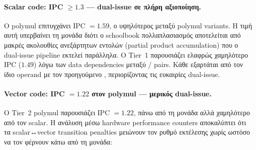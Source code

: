 \paragraph{Scalar code: IPC $\geq 1.3$ — dual-issue σε πλήρη αξιοποίηση.}
Ο  polymul επιτυγχάνει IPC $= 1.59$, ο υψηλότερος
μεταξύ polymul variants. Η τιμή αυτή υπερβαίνει τη μονάδα διότι ο
schoolbook πολλαπλασιασμός αποτελείται από μακρές ακολουθίες ανεξάρτητων
 εντολών (partial product accumulation) που ο dual-issue
pipeline εκτελεί παράλληλα. Ο Tier~1 παρουσιάζει ελαφρώς
χαμηλότερο IPC ($1.49$) λόγω των data dependencies μεταξύ
/ pairs. Κάθε  εξαρτάται από
τον ίδιο operand με τον προηγούμενο , περιορίζοντας τις
ευκαιρίες dual-issue.

\paragraph{Vector code: IPC $= 1.22$ στον polymul — μερικός dual-issue.}
Ο Tier~2 polymul παρουσιάζει IPC $= 1.22$, πάνω από τη
μονάδα αλλά χαμηλότερο από τον scalar. Η ανάλυση μέσω hardware
performance counters αποκαλύπτει ότι τα scalar↔vector transition
penalties μειώνουν τον ρυθμό εκτέλεσης χωρίς ωστόσο να τον φέρνουν
κάτω από τη μονάδα:

